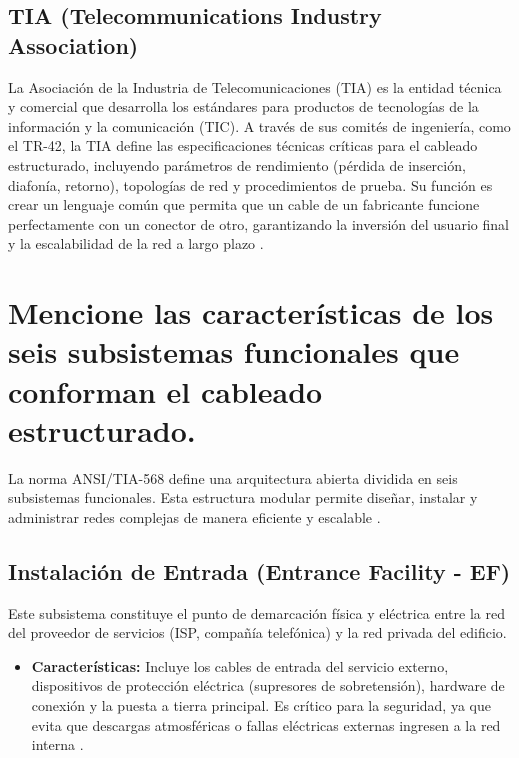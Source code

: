 \documentclass[a4paper,12pt]{article}
\begin{document}
\subsection{TIA (Telecommunications Industry Association)}
La Asociación de la Industria de Telecomunicaciones (TIA) es la entidad técnica y comercial que desarrolla los estándares para productos de tecnologías de la información y la comunicación (TIC). A través de sus comités de ingeniería, como el TR-42, la TIA define las especificaciones técnicas críticas para el cableado estructurado, incluyendo parámetros de rendimiento (pérdida de inserción, diafonía, retorno), topologías de red y procedimientos de prueba. Su función es crear un lenguaje común que permita que un cable de un fabricante funcione perfectamente con un conector de otro, garantizando la inversión del usuario final y la escalabilidad de la red a largo plazo \cite{ansi_tia, udenar}.

\newpage

\section{Mencione las características de los seis subsistemas funcionales que conforman el cableado estructurado.}

La norma ANSI/TIA-568 define una arquitectura abierta dividida en seis subsistemas funcionales. Esta estructura modular permite diseñar, instalar y administrar redes complejas de manera eficiente y escalable \cite{sysracks}.

\subsection{Instalación de Entrada (Entrance Facility - EF)}
Este subsistema constituye el punto de demarcación física y eléctrica entre la red del proveedor de servicios (ISP, compañía telefónica) y la red privada del edificio.
\begin{itemize}
    \item \textbf{Características:} Incluye los cables de entrada del servicio externo, dispositivos de protección eléctrica (supresores de sobretensión), hardware de conexión y la puesta a tierra principal. Es crítico para la seguridad, ya que evita que descargas atmosféricas o fallas eléctricas externas ingresen a la red interna \cite{tabasco}.
\end{itemize}
\end{document}
